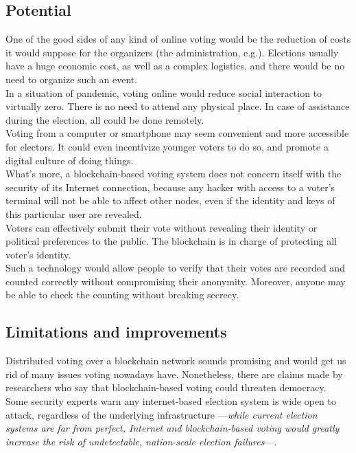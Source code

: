 \documentclass[10pt]{article}
\begin{document}
\begin{multicols}{2}
\subsection{Potential}

One of the good sides of any kind of online voting would be the reduction of costs it would suppose for the organizers (the administration, e.g.). Elections usually have a huge economic cost, as well as a complex logistics, and there would be no need to organize such an event.\\

In a situation of pandemic, voting online would reduce social interaction to virtually zero. There is no need to attend any physical place. In case of assistance during the election, all could be done remotely.\\

Voting from a computer or smartphone may seem convenient and more accessible for electors. It could even incentivize younger voters to do so, and promote a digital culture of doing things.\\

What's more, a blockchain-based voting system does not concern itself with the security of its Internet connection, because any hacker with access to a voter's terminal will not be able to affect other nodes, even if the identity and keys of this particular user are revealed.\\

Voters can effectively submit their vote without revealing their identity or political preferences to the public. The blockchain is in charge of protecting all voter's identity.\\

Such a technology would allow people to verify that their votes are recorded and counted correctly without compromising their anonymity. Moreover, anyone may be able to check the counting without breaking secrecy.

\subsection{Limitations and improvements}
\label{sec:limitations}

Distributed voting over a blockchain network sounds promising and would get us rid of many issues voting nowadays have. Nonetheless, there are claims made by  researchers\cite{ref:park} who say that blockchain-based voting could threaten democracy. Some security experts warn any internet-based election system is wide open to attack, regardless of the underlying infrastructure ---\textit{while current election systems are far from perfect, Internet and blockchain-based voting would greatly increase the risk of undetectable, nation-scale election failures}---.\\


\end{multicols}
\end{document}
